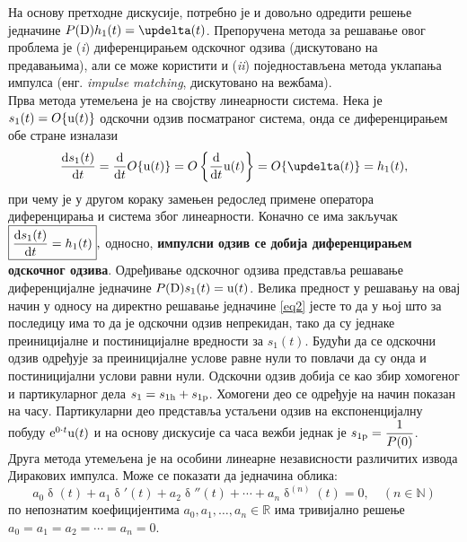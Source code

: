 На основу претходне дискусије, потребно је и довољно
одредити решење једначине 
$P({\rm D}) h_1(t) = \updelta(t)$. Препоручена 
метода
за решавање овог проблема је (\textit{i}) 
диференцирањем одскочног одзива (дискутовано на предавањима), али се може користити и 
(\textit{ii}) 
поједностављена
метода уклапања импулса (енг. 
\textit{impulse matching}, дискутовано на вежбама).
\\[1mm]
\indent
Прва метода утемељена је на својству линеарности 
система. Нека је $s_1(t) = O\{ {\rm u}(t) \}$ 
одскочни
одзив посматраног система, онда се диференцирањем 
обе стране изналази
\begin{equation}
\dfrac{{\rm d}s_1(t)}{{\rm d}t} = 
\dfrac{{\rm d}}{{\rm d}t} O\{ {\rm u}(t) \}
= 
 O\left\{ 
 \dfrac{{\rm d}}{{\rm d}t} {\rm u}(t) \right\}
 = O\{\updelta(t)\} = h_1(t),
\end{equation}
при чему је у другом кораку замењен редослед 
примене оператора диференцирања и система због
линеарности. Коначно се има закључак 
$
\boxed{
\dfrac{{\rm d}s_1(t)}{{\rm d}t} =  h_1(t)
},
$ 
односно, \textbf{импулсни одзив се добија диференцирањем  одскочног одзива}. Одређивање одскочног одзива 
представља решавање диференцијалне једначине 
$P({\rm D}) s_1(t) = {\rm u}(t)$. Велика предност 
у решавању на овај начин у односу на директно 
решавање једначине \eqref{eq2} јесте то да у њој 
 што за последицу 
има то да је одскочни одзив непрекидан, тако да су
једнаке преиницијалне и постиницијалне вредности 
за $s_1(t)$. Будући да се одскочни одзив 
одређује за преиницијалне услове равне нули 
то повлачи да су онда и постиницијални услови 
равни нули. 
Одскочни одзив добија се као збир хомогеног и 
партикуларног дела $s_1 = s_{1\rm h} + s_{1\rm p}$. 
Хомогени део се одређује на начин показан на часу.
Партикуларни део
представља устаљени одзив на 
експоненцијалну побуду ${\rm e}^{0\cdot t} 
{\rm u}(t)$ и на основу дискусије са часа вежби 
једнак је $s_{\rm 1p} = \dfrac{1}{P(0)}$.
\\[1mm]
\indent
Друга метода утемељена је на особини линеарне 
независности различитих извода Диракових импулса.
Може се показати да једначина облика:
\begin{equation}
a_0 \updelta(t) + 
a_1 \updelta'(t) + 
a_2 \updelta''(t) + 
\cdots
+ a_n \updelta^{(n)}(t) = 0, \quad (n \in \mathbb N)
\end{equation} 
по непознатим коефицијентима $a_0, a_1, 
\ldots, a_n \in \mathbb R$ има  тривијално 
решење $a_0 = a_1 = a_2 = \cdots = a_n = 0$. 
